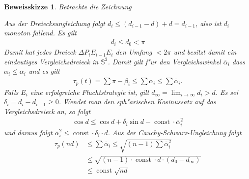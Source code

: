 \documentclass[paper=A4, twoside, chapterprefix=true, bibliography=totoc, headsepline]{scrbook}
\newcommand{\tikzgitter}[3][0.25]{ %
	\draw[step=#1,gray!15] #2 grid #3;
	\draw[step=2*#1,gray!30] #2 grid #3;
	\fill (0,0) circle(0.1); 
}
\renewcommand{\S}{\mathbb{S}}
\DeclareMathOperator{\const}{const} %
\theoremstyle{nonumberbreak}
\newtheorem{bewSkiz}{Beweisskizze}
\theoremstyle{emptybreak}
\theoremstyle{break}
\begin{document}
\begin{bewSkiz}
Betrachte die Zeichnung
\begin{center}\end{center}
Aus der Dreiecksungleichung folgt $d_i \le (d_{i-1} - d) + d = d_{i-1}$, also ist $d_i$ monoton fallend.
Es gilt
\begin{align*}
	d_i \le d_0 < \pi
\end{align*}
Damit hat jedes Dreieck $\Delta P_iE_{i-1}E_i$ den Umfang $<2\pi$ und besitzt damit ein eindeutiges Vergleichsdreieck in $\S^2$.
Damit gilt f"ur den Vergleichswinkel $\overline\alpha_i$ dass $\alpha_i \le \overline\alpha_i$ und es gilt
\begin{align*}
	\tau_p(t) = \sum \pi - \beta_i \le \sum \alpha_i \le \sum \overline\alpha_i.
\end{align*}
Falls $E_i$ eine erfolgreiche Fluchtstrategie ist, gilt $d_\infty = \lim_{i \to \infty} d_i > d$.
Es sei $\delta_i = d_i - d_{i-1} \ge 0$.
Wendet man den sph"arischen Kosinussatz auf das Vergleichsdreieck an, so folgt
\begin{align*}
	\cos d \le \cos d + \delta_i \sin d - \const \cdot \overline\alpha_i^2
\end{align*}
und daraus folgt $\overline\alpha_i^2 \le \const \cdot \delta_i \cdot d$.
Aus der Cauchy-Schwarz-Ungleichung folgt
\begin{align*}
	\tau_p(nd) &\le \sum \overline\alpha_i \le \sqrt{(n-1) \sum \overline\alpha_i^2} \\
	&\le \sqrt{(n-1) \cdot \const \cdot d \cdot (d_0 - d_\infty)} \\
	&\le \const \sqrt{nd}
\end{align*}
\end{bewSkiz}
\end{document}
